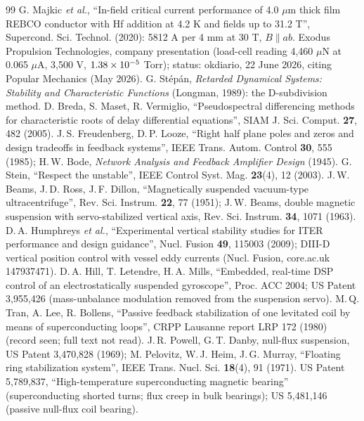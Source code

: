 \begin{thebibliography}{99}
 G. Majkic \emph{et al.}, ``In-field critical current performance of 4.0 $\mu$m thick film REBCO conductor with Hf addition at 4.2 K and fields up to 31.2 T'', Supercond. Sci. Technol. (2020): 5812 A per 4 mm at 30 T, $B\parallel ab$.
 Exodus Propulsion Technologies, company presentation (load-cell reading 4,460 $\mu$N at 0.065 $\mu$A, 3,500 V, $1.38\times10^{-5}$ Torr); status: okdiario, 22 June 2026, citing Popular Mechanics (May 2026).
 G. St\'ep\'an, \emph{Retarded Dynamical Systems: Stability and Characteristic Functions} (Longman, 1989): the D-subdivision method.
 D. Breda, S. Maset, R. Vermiglio, ``Pseudospectral differencing methods for characteristic roots of delay differential equations'', SIAM J. Sci. Comput. \textbf{27}, 482 (2005).
 J.\,S. Freudenberg, D.\,P. Looze, ``Right half plane poles and zeros and design tradeoffs in feedback systems'', IEEE Trans. Autom. Control \textbf{30}, 555 (1985); H.\,W. Bode, \emph{Network Analysis and Feedback Amplifier Design} (1945).
 G. Stein, ``Respect the unstable'', IEEE Control Syst. Mag. \textbf{23}(4), 12 (2003).
 J.\,W. Beams, J.\,D. Ross, J.\,F. Dillon, ``Magnetically suspended vacuum-type ultracentrifuge'', Rev. Sci. Instrum. \textbf{22}, 77 (1951); J.\,W. Beams, double magnetic suspension with servo-stabilized vertical axis, Rev. Sci. Instrum. \textbf{34}, 1071 (1963).
 D.\,A. Humphreys \emph{et al.}, ``Experimental vertical stability studies for ITER performance and design guidance'', Nucl. Fusion \textbf{49}, 115003 (2009); DIII-D vertical position control with vessel eddy currents (Nucl. Fusion, core.ac.uk 147937471).
 D.\,A. Hill, T. Letendre, H.\,A. Mills, ``Embedded, real-time DSP control of an electrostatically suspended gyroscope'', Proc. ACC 2004; US Patent 3,955,426 (mass-unbalance modulation removed from the suspension servo).
 M.\,Q. Tran, A. Lee, R. Bollens, ``Passive feedback stabilization of one levitated coil by means of superconducting loops'', CRPP Lausanne report LRP 172 (1980) (record seen; full text not read).
 J.\,R. Powell, G.\,T. Danby, null-flux suspension, US Patent 3,470,828 (1969); M. Pelovitz, W.\,J. Heim, J.\,G. Murray, ``Floating ring stabilization system'', IEEE Trans. Nucl. Sci. \textbf{18}(4), 91 (1971).
 US Patent 5,789,837, ``High-temperature superconducting magnetic bearing'' (superconducting shorted turns; flux creep in bulk bearings); US 5,481,146 (passive null-flux coil bearing).

\end{thebibliography}
